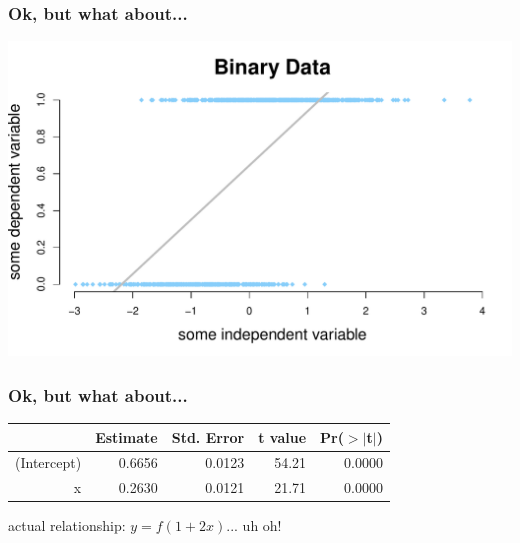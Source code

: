 \documentclass[aspectratio=169]{beamer}
\begin{document}
\begin{frame}
\frametitle{Ok, but what about...}
\begin{center}
\includegraphics[scale=0.55]{binary_data_w_line.pdf}
\end{center}
\end{frame}

\begin{frame}
\frametitle{Ok, but what about...}
\begin{table}[ht]
\centering
\begin{tabular}{rrrrr}
  \hline
 & Estimate & Std. Error & t value & Pr($>$$|$t$|$) \\ 
  \hline
(Intercept) & 0.6656 & 0.0123 & 54.21 & 0.0000 \\ 
  x & 0.2630 & 0.0121 & 21.71 & 0.0000 \\ 
   \hline
\end{tabular}
\end{table}

\begin{center}\Large
actual relationship: $y = f(1 + 2x)$... uh oh!
\end{center}

\end{frame}
\end{document}
